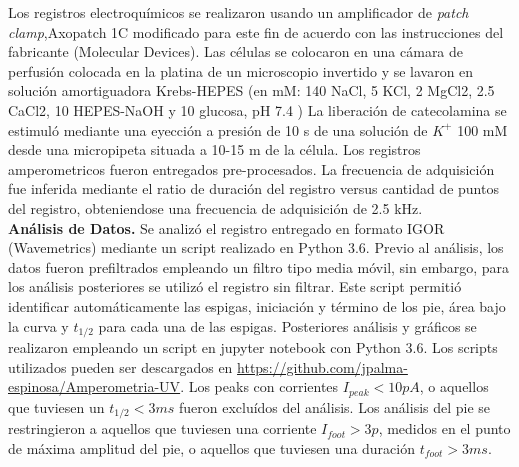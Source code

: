 \documentclass[twocolumn]{article}
\begin{document}
Los registros electroquímicos se realizaron usando un amplificador de \textit{patch clamp},Axopatch 1C modificado para este fin de acuerdo con las instrucciones del fabricante (Molecular Devices). Las células se colocaron en una cámara de perfusión colocada en la platina de un microscopio invertido y se lavaron en solución amortiguadora Krebs-HEPES (en mM: 140 NaCl, 5 KCl, 2 MgCl2, 2.5 CaCl2, 10 HEPES-NaOH y 10 glucosa, pH 7.4 ) La liberación de catecolamina se estimuló mediante una eyección a presión de 10 s de una solución de $K^+$  100 mM desde una micropipeta situada a 10-15 m de la célula.
Los registros amperometricos fueron entregados pre-procesados. La frecuencia de adquisición fue inferida mediante el ratio de duración del registro versus cantidad de puntos del registro, obteniendose una frecuencia de adquisición de 2.5 kHz. \\
{\bf Análisis de Datos.} Se analizó el registro entregado en formato IGOR (Wavemetrics) mediante un script realizado en Python 3.6.  Previo al análisis, los datos fueron prefiltrados empleando un filtro tipo media móvil, sin embargo, para los análisis posteriores se utilizó el registro sin filtrar. Este script permitió identificar automáticamente las espigas, iniciación y término de los pie, área bajo la curva y $t_{1/2}$ para cada una de las espigas.  Posteriores análisis y gráficos se realizaron empleando un script en jupyter notebook con Python 3.6.  Los scripts utilizados pueden ser descargados en \url{https://github.com/jpalma-espinosa/Amperometria-UV}.
Los peaks con corrientes $I_{peak}<10 pA$, o aquellos que tuviesen un $t_{1/2}<3ms$ fueron excluídos del análisis. Los análisis del pie se restringieron a aquellos que tuviesen una corriente $I_{foot}>3p$, medidos en el punto de máxima amplitud del pie, o aquellos que tuviesen una duración $t_{foot}>3ms$.
\end{document}
